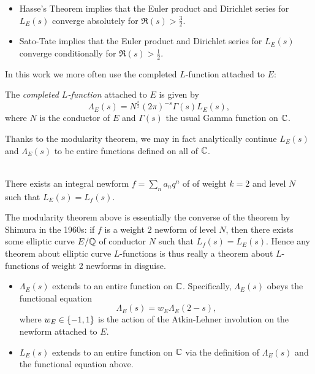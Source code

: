 \documentclass[10pt]{article}
\newcommand{\Les}{L_E(s)}
\newcommand{\Lams}{\Lambda_E(s)}
\begin{document}
\begin{corollary} \mbox{}
\begin{itemize}
\item Hasse's Theorem implies that the Euler product and Dirichlet series for $\Les$ converge absolutely for $\Re(s) > \frac{3}{2}$.
\item Sato-Tate implies that the Euler product and Dirichlet series for $\Les$ converge conditionally for $\Re(s) > \frac{1}{2}$.
\end{itemize}
\end{corollary}

In this work we more often use the completed $L$-function attached to $E$:
\begin{definition}
The {\it completed $L$-function} attached to $E$ is given by
\begin{equation}
\Lambda_E(s) = N^{\frac{s}{2}}(2\pi)^{-s}\Gamma(s)\Les,
\end{equation}
where $N$ is the conductor of $E$ and $\Gamma(s)$ the usual Gamma function on $\mathbb{C}$.
\end{definition}

Thanks to the modularity theorem, we may in fact analytically continue $\Les$ and $\Lams$ to be entire functions defined on all of $\mathbb{C}$.
\begin{theorem} \mbox{}\\
There exists an integral newform $f = \sum_n a_n q^n$ of of weight $k=2$ and level $N$ such that $\Les = L_f(s)$.
\end{theorem}

The modularity theorem above is essentially the converse of the theorem by Shimura in the 1960s: if $f$ is a weight $2$ newform of level $N$, then there exists some elliptic curve $E/\mathbb{Q}$ of conductor $N$ such that $L_f(s) = L_E(s)$. Hence any theorem about elliptic curve $L$-functions is thus really a theorem about $L$-functions of weight 2 newforms in disguise. \\

\begin{corollary} \mbox{}
\begin{itemize}
\item $\Lams$ extends to an entire function on $\mathbb{C}$. Specifically, $\Lams$ obeys the functional equation
\begin{equation}
\Lams = w_E \Lambda_E(2-s),
\end{equation}
where $w_E \in \left\{-1, 1\right\}$ is the action of the Atkin-Lehner involution on the newform attached to $E$.
\item $\Les$ extends to an entire function on $\mathbb{C}$ via the definition of $\Lams$ and the functional equation above.
\end{itemize}
\end{corollary}
\end{document}
